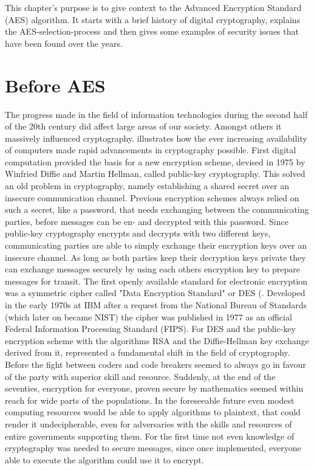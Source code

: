 This chapter's purpose is to give context to the Advanced Encryption Standard (\ac{AES}) algorithm. It starts with a brief history of digital cryptography, explains the \ac{AES}-selection-process and then gives some examples of security issues that have been found over the years.


\section{Before AES}
\label{ch:before-aes}
The progress made in the field of information technologies during the second half of the 20th century did affect large areas of our society. Amongst others it massively influenced cryptography. \cite{cryptorebels} illustrates how the ever increasing availability of computers made rapid advancements in cryptography possible. First digital computation provided the basis for a new encryption scheme, devised in 1975 by Winfried Diffie and Martin Hellman, called public-key cryptography. This solved an old problem in cryptography, namely establishing a shared secret over an insecure communication channel. Previous encryption schemes always relied on such a secret, like a password, that needs exchanging between the communicating parties, before messages can be en- and decrypted with this password. Since public-key cryptography encrypts and decrypts with two different keys, communicating parties are able to simply exchange their encryption keys over an insecure channel. As long as both parties keep their decryption keys private they can exchange messages securely by using each others encryption key to prepare messages for transit.
The first openly available standard for electronic encryption was a symmetric cipher called "Data Encryption Standard" or DES (\cite[p. 105]{appcrypt}. Developed in the early 1970s at IBM after a request from the National Bureau of Standards (which later on became \ac{NIST}) the cipher was published in 1977 as an official Federal Information Processing Standard (\ac{FIPS}). For \cite[p. 2]{cryptodream} DES and the public-key encryption scheme with the algorithms RSA and the Diffie-Hellman key exchange derived from it, represented a fundamental shift in the field of cryptography. Before the fight between coders and code breakers seemed to always go in favour of the party with superior skill and resource. Suddenly, at the end of the seventies, encryption for everyone, proven secure by mathematics seemed within reach for wide parts of the populations. In the foreseeable future even modest computing resources would be able to apply algorithms to plaintext, that could render it undecipherable, even for adversaries with the skills and resources of entire governments supporting them. For the first time not even knowledge of cryptography was needed to secure messages, since once implemented, everyone able to execute the algorithm could use it to encrypt.

